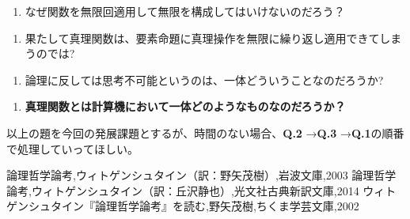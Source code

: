 \documentclass[a4paper,onecolumn,article]{jarticle}
\newcounter{ct}               %
\begin{document}
{\bf
\setcounter{ct}{1}

\begin{enumerate}
  \item なぜ関数を無限回適用して無限を構成してはいけないのだろう？
\end{enumerate}

\begin{enumerate}
  \item 果たして真理関数は、要素命題に真理操作を無限に繰り返し適用できてしまうのでは?
\end{enumerate}

\begin{enumerate}
  \item 論理に反しては思考不可能というのは、一体どういうことなのだろうか?
\end{enumerate}

\begin{enumerate}
  \item {\bf 真理関数とは計算機において一体どのようなものなのだろうか？ }
\end{enumerate}

}
\addtocounter{ct}{-1}
以上の題を今回の発展課題とするが、時間のない場合、{\bf Q.2 }→{\bf Q.3 }→{\bf Q.1}の順番で処理していってほしい。

\begin{thebibliography}{9}
   論理哲学論考,ウィトゲンシュタイン（訳：野矢茂樹）,岩波文庫,2003
   論理哲学論考,ウィトゲンシュタイン（訳：丘沢静也）,光文社古典新訳文庫,2014
   ウィトゲンシュタイン『論理哲学論考』を読む,野矢茂樹,ちくま学芸文庫,2002
\end{thebibliography}
\end{document}
